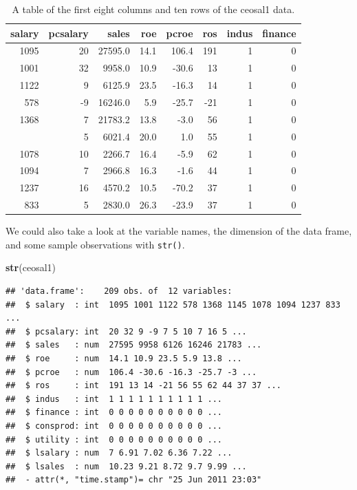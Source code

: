 \documentclass[]{book}
\newenvironment{Shaded}{\begin{snugshade}}{\end{snugshade}}
\newcommand{\KeywordTok}[1]{\textcolor[rgb]{0.13,0.29,0.53}{\textbf{#1}}}
\newcommand{\NormalTok}[1]{#1}
\begin{document}
\begin{table}

\caption{\label{tab:unnamed-chunk-6}A table of the first eight columns and ten rows of the ceosal1 data.}
\centering
\begin{tabular}[t]{rrrrrrrr}
\toprule
salary & pcsalary & sales & roe & pcroe & ros & indus & finance\\
\midrule
1095 & 20 & 27595.0 & 14.1 & 106.4 & 191 & 1 & 0\\
1001 & 32 & 9958.0 & 10.9 & -30.6 & 13 & 1 & 0\\
1122 & 9 & 6125.9 & 23.5 & -16.3 & 14 & 1 & 0\\
578 & -9 & 16246.0 & 5.9 & -25.7 & -21 & 1 & 0\\
1368 & 7 & 21783.2 & 13.8 & -3.0 & 56 & 1 & 0\\
\addlinespace
1145 & 5 & 6021.4 & 20.0 & 1.0 & 55 & 1 & 0\\
1078 & 10 & 2266.7 & 16.4 & -5.9 & 62 & 1 & 0\\
1094 & 7 & 2966.8 & 16.3 & -1.6 & 44 & 1 & 0\\
1237 & 16 & 4570.2 & 10.5 & -70.2 & 37 & 1 & 0\\
833 & 5 & 2830.0 & 26.3 & -23.9 & 37 & 1 & 0\\
\bottomrule
\end{tabular}
\end{table}

We could also take a look at the variable names, the dimension of the
data frame, and some sample observations with \texttt{str()}.

\begin{Shaded}
\begin{Highlighting}[]
\KeywordTok{str}\NormalTok{(ceosal1)}
\end{Highlighting}
\end{Shaded}

\begin{verbatim}
## 'data.frame':    209 obs. of  12 variables:
##  $ salary  : int  1095 1001 1122 578 1368 1145 1078 1094 1237 833 ...
##  $ pcsalary: int  20 32 9 -9 7 5 10 7 16 5 ...
##  $ sales   : num  27595 9958 6126 16246 21783 ...
##  $ roe     : num  14.1 10.9 23.5 5.9 13.8 ...
##  $ pcroe   : num  106.4 -30.6 -16.3 -25.7 -3 ...
##  $ ros     : int  191 13 14 -21 56 55 62 44 37 37 ...
##  $ indus   : int  1 1 1 1 1 1 1 1 1 1 ...
##  $ finance : int  0 0 0 0 0 0 0 0 0 0 ...
##  $ consprod: int  0 0 0 0 0 0 0 0 0 0 ...
##  $ utility : int  0 0 0 0 0 0 0 0 0 0 ...
##  $ lsalary : num  7 6.91 7.02 6.36 7.22 ...
##  $ lsales  : num  10.23 9.21 8.72 9.7 9.99 ...
##  - attr(*, "time.stamp")= chr "25 Jun 2011 23:03"
\end{verbatim}
\end{document}
